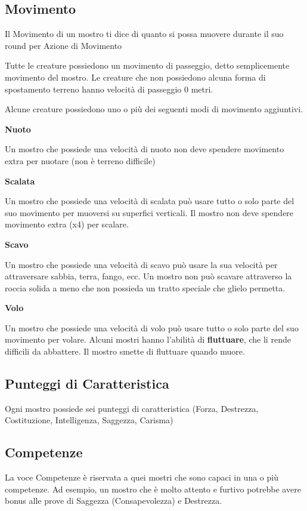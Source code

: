 \begin{multicols}{2}
\subsection{Movimento}

Il Movimento di un mostro ti dice di quanto si possa muovere durante il suo round per Azione di Movimento

Tutte le creature possiedono un movimento di passeggio, detto semplicemente movimento del mostro. Le creature che non possiedono alcuna forma di spostamento terreno hanno velocità di passeggio 0 metri.

Alcune creature possiedono uno o più dei seguenti modi di movimento aggiuntivi.

\smallskip\textbf{Nuoto}

Un mostro che possiede una velocità di nuoto non deve spendere movimento extra per nuotare (non è terreno difficile)

\smallskip\textbf{Scalata}

Un mostro che possiede una velocità di scalata può usare tutto o solo parte del suo movimento per muoversi su superfici verticali. Il mostro non deve spendere movimento extra (x4) per scalare.

\smallskip\textbf{Scavo}

Un mostro che possiede una velocità di scavo può usare la sua velocità per attraversare sabbia, terra, fango, ecc. Un mostro non può scavare attraverso la roccia solida a meno che non possieda un tratto speciale che glielo permetta.

\smallskip\textbf{Volo}

Un mostro che possiede una velocità di volo può usare tutto o solo parte del suo movimento per volare. Alcuni mostri hanno l'abilità di \textbf{fluttuare}, che li rende difficili da abbattere. Il mostro smette di fluttuare quando muore.

\subsection{Punteggi di Caratteristica}

Ogni mostro possiede sei punteggi di caratteristica (Forza, Destrezza, Costituzione, Intelligenza, Saggezza, Carisma)

\subsection{Competenze}

La voce Competenze è riservata a quei mostri che sono capaci in una o più competenze. Ad esempio, un mostro che è molto attento e furtivo potrebbe avere bonus alle prove di Saggezza (Consapevolezza) e Destrezza.


\end{multicols}
